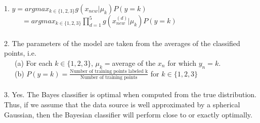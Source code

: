 \documentclass[12pt,letterpaper,boxed]{hmcpset}
\begin{document}

\begin{problem}

\end{problem}

\begin{solution}
1. $\hat{y} = argmax_{k \in \lbrace 1,2,3 \rbrace} g(x_{new} | \mu_k) P(y=k)$ \\
\phantom{x}\ \ \ \ \ $= argmax_{k \in \lbrace 1,2,3 \rbrace} \prod\limits_{d=1}^5 g(x_{new}^{(d)} | \mu_k) P(y=k)$ \\ \\
2. The parameters of the model are taken from the averages of the classified points, i.e.\\ 
\phantom{x}\ \ \ (a) For each $k \in \lbrace 1,2,3 \rbrace $, $\mu_k = $average of the $x_n$ for which $y_n = k$. \\
\phantom{x}\ \ \ (b) $P(y = k) =  \frac{\text{Number of training points labeled k}}{\text{Number of training points}}$ for $k \in \lbrace 1,2,3 \rbrace$ \\ \\
3. Yes. The Bayes classifier is optimal when computed from the true distribution. Thus, if we assume that the data source is well approximated by a spherical Gaussian, then the Bayesian classifier will perform close to or exactly optimally. 

\end{solution}


\begin{problem}

\end{problem}
\end{document}
